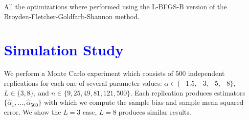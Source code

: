 \documentclass[a0,portrait]{a0poster}
\begin{document}
\begin{multicols}{3}
All the optimizations where performed using the L-BFGS-B version of the Broyden-Fletcher-Goldfarb-Shannon method.

\section*{\textcolor{blue}{Simulation Study}}
We perform a Monte Carlo experiment which consists of $500$ independent replications for each one of several parameter values: 
$\alpha\in\{-1.5, -3, -5, -8\}$, $L\in\{3,8\}$, and $n\in\{9, 25,49, 81,121,500\}$. 
Each replication produces estimators $\{\widehat{\alpha}_1, \dots, \widehat{\alpha}_{500}\}$ with which we compute the sample bias and sample mean squared error. We show the $L=3$ case, $L=8$ produces similar results.



\end{multicols}
\end{document}

